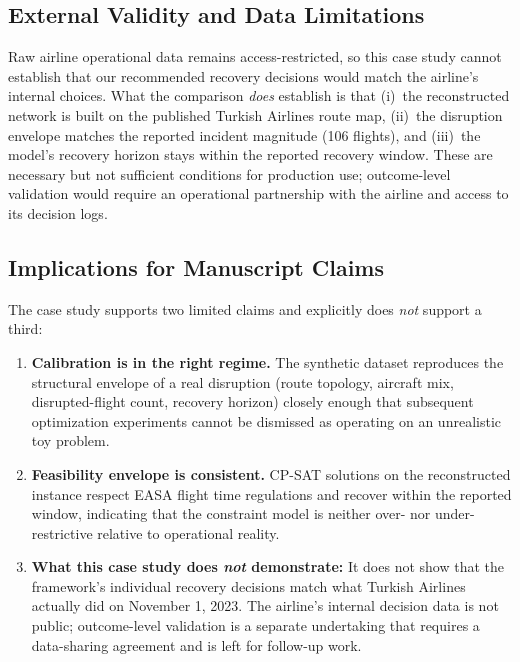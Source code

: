 \documentclass[12pt,number]{elsarticle}
\begin{document}
\subsection{External Validity and Data Limitations}

Raw airline operational data remains access-restricted, so this case study cannot establish that our recommended recovery decisions would match the airline's internal choices. What the comparison \emph{does} establish is that (i)~the reconstructed network is built on the published Turkish Airlines route map, (ii)~the disruption envelope matches the reported incident magnitude (106 flights), and (iii)~the model's recovery horizon stays within the reported recovery window. These are necessary but not sufficient conditions for production use; outcome-level validation would require an operational partnership with the airline and access to its decision logs.

\subsection{Implications for Manuscript Claims}

The case study supports two limited claims and explicitly does \emph{not} support a third:

\begin{enumerate}
\item \textbf{Calibration is in the right regime.} The synthetic dataset reproduces the structural envelope of a real disruption (route topology, aircraft mix, disrupted-flight count, recovery horizon) closely enough that subsequent optimization experiments cannot be dismissed as operating on an unrealistic toy problem.

\item \textbf{Feasibility envelope is consistent.} CP-SAT solutions on the reconstructed instance respect EASA flight time regulations and recover within the reported window, indicating that the constraint model is neither over- nor under-restrictive relative to operational reality.

\item \textbf{What this case study does \emph{not} demonstrate:} It does not show that the framework's individual recovery decisions match what Turkish Airlines actually did on November 1, 2023. The airline's internal decision data is not public; outcome-level validation is a separate undertaking that requires a data-sharing agreement and is left for follow-up work.
\end{enumerate}
\end{document}
